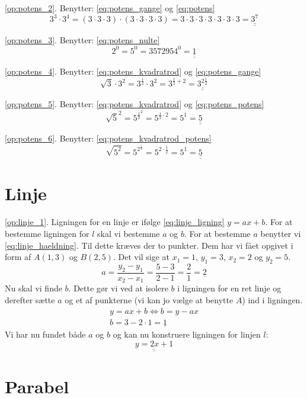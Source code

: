 \documentclass[11pt,a5paper,fleqn,leqno]{book}
\begin{document}
\ref{op:potens_2}. Benytter: \eqref{eq:potens_gange} og \eqref{eq:potens}
\[3^3 \cdot 3^4 = (3 \cdot 3 \cdot 3) \cdot (3 \cdot 3 \cdot 3 \cdot 3) = 3 \cdot 3 \cdot 3 \cdot 3 \cdot 3 \cdot 3 \cdot 3 = \underline{\underline{3^7}}\]

\ref{op:potens_3}. Benytter: \eqref{eq:potens_nulte}
\[2^0 = 5^0 = 3572954^0 = \underline{\underline{1}}\]

\ref{op:potens_4}. Benytter: \eqref{eq:potens_kvadratrod} og \eqref{eq:potens_gange}
\[\sqrt{3} \cdot 3^2 = 3^{\frac{1}{2}} \cdot 3^2 = 3^{\frac{1}{2}+2} = \underline{\underline{3^{2\frac{1}{2}}}}\]

\ref{op:potens_5}. Benytter: \eqref{eq:potens_kvadratrod} og \eqref{eq:potens_potens}
\[\sqrt{5}^2 = 5^{\frac{1}{2}^2} = 5^{\frac{1}{2} \cdot 2} = 5^1 = \underline{\underline{5}}\]

\ref{op:potens_6}. Benytter: \eqref{eq:potens_kvadratrod_potens}
\[\sqrt{5^2} = 5^{2^{\frac{1}{2}}} = 5^{2 \cdot \frac{1}{2}} = 5^1 = \underline{\underline{5}}\]

\section{Linje}

\ref{op:linje_1}. Ligningen for en linje er ifølge \eqref{eq:linje_ligning} $y = ax+b$. For at bestemme ligningen for $l$ skal vi bestemme $a$ og $b$. For at bestemme $a$ benytter vi \eqref{eq:linje_haeldning}. Til dette kræves der to punkter. Dem har vi fået opgivet i form af $A(1,3)$ og $B(2,5)$. Det vil sige at $x_1 = 1$, $y_1 = 3$, $x_2 = 2$ og $y_2 = 5$.
\[a = \dfrac{y_2 - y_1}{x_2 - x_1} = \dfrac{5-3}{2-1} = \dfrac{2}{1} = \underline{2}\]
Nu skal vi finde $b$. Dette gør vi ved at isolere $b$ i ligningen for en ret linje og derefter sætte $a$ og et af punkterne (vi kan jo vælge at benytte $A$) ind i ligningen.
\begin{displaymath}\begin{array}{l}
y = ax+b \Leftrightarrow b = y-ax \\
b = 3 - 2 \cdot 1 = \underline{1}
\end{array}\end{displaymath}
Vi har nu fundet både $a$ og $b$ og kan nu konstruere ligningen for linjen $l$:
\[\underline{\underline{y = 2x+1}}\]

\section{Parabel}
\end{document}
